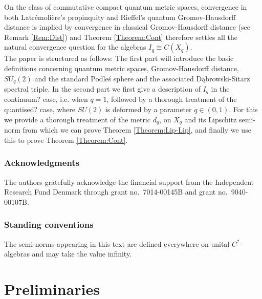 \documentclass[11pt, reqno, a4paper, final]{amsart}
\theoremstyle{plain}
\theoremstyle{definition}
\newcommand{\NN}{{\mathbb N}}
\newcommand{\black}{\color{black}}
\begin{document}
On the class of commutative compact quantum metric spaces, convergence in both  Latrémolière's propinquity {\black \cite{Latremoliere}} and Rieffel's quantum Gromov-Hausdorff distance {\black \cite{Rieffel-distance}} is implied by convergence in classical Gromov-Hausdorff distance (see Remark \ref{Rem:Dist}) and Theorem \ref{Theorem:Cont} therefore settles all the natural convergence question for the algebras $I_q\cong C(X_q)$.\\



The paper is structured as follows: The first part will introduce the basic definitions concerning quantum metric spaces, Gromov-Hausdorff distance, $SU_q(2)$ and the standard Podle\'s sphere and the associated Dąbrowski-Sitarz spectral triple. In the second part we first give a description of $I_q$ in the {\black continuum?} case, i.e. when $q=1$, followed by a thorough treatment of the {\black quantised?} case, where $SU(2)$ is deformed by a parameter $q\in(0,1)$. For this we provide a thorough treatment of the metric $d_q$, on $X_q$ and its Lipschitz semi-norm from which we can prove Theorem \ref{Theorem:Lip-Lip}, and finally we use this to prove Theorem \ref{Theorem:Cont}.


\subsubsection*{Acknowledgments}
The authors gratefully acknowledge the financial support  from the Independent Research Fund Denmark  through grant no.~7014-00145B and grant no.~9040-00107B.

\subsubsection*{{\black Standing conventions}}
{\black The semi-norms appearing in this text are defined everywhere on unital $C^*$-algebras and may take the value infinity.}





\section{Preliminaries}\label{sec:prelim}
\end{document}
